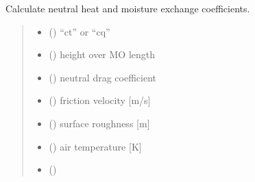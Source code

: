 \documentclass[letterpaper,10pt,english]{sphinxmanual}
\begin{document}
\begin{fulllineitems}
\label{\detokenize{users_guide:AirSeaFluxCode.flux_subs.heat_coef.ctqn_calc}}
\pysigstartsignatures
{}
\pysigstopsignatures
\sphinxAtStartPar
Calculate neutral heat and moisture exchange coefficients.
\begin{quote}\begin{description}
\begin{itemize}
\item {} 
\sphinxAtStartPar
{} () \textendash{} “ct” or “cq”

\item {} 
\sphinxAtStartPar
{} () \textendash{} height over MO length

\item {} 
\sphinxAtStartPar
{} () \textendash{} neutral drag coefficient

\item {} 
\sphinxAtStartPar
{} () \textendash{} friction velocity      {[}m/s{]}

\item {} 
\sphinxAtStartPar
{} () \textendash{} surface roughness       {[}m{]}

\item {} 
\sphinxAtStartPar
{} () \textendash{} air temperature         {[}K{]}

\item {} 
\sphinxAtStartPar
{} () \textendash{} 


\end{itemize}
\end{description}
\end{quote}
\end{fulllineitems}
\end{document}
